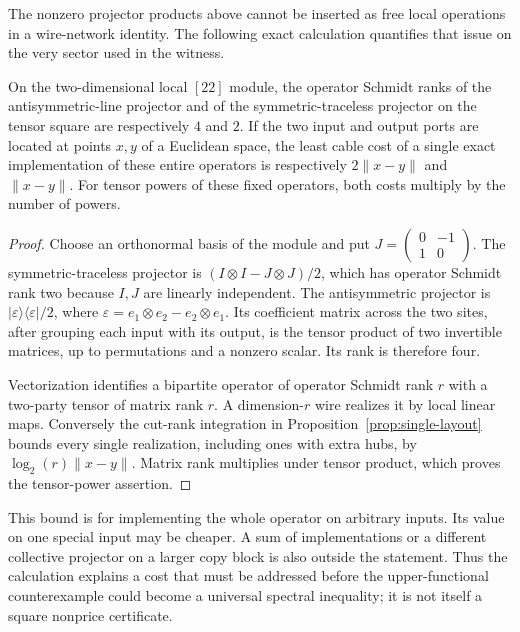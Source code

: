 The nonzero projector products above cannot be inserted as free local
operations in a wire-network identity. The following exact calculation
quantifies that issue on the very sector used in the witness.

\begin{proposition}\label{prop:crossing-projector-cost}
On the two-dimensional local $[22]$ module, the operator Schmidt ranks
of the antisymmetric-line projector and of the symmetric-traceless
projector on the tensor square are respectively $4$ and $2$.
If the two input and output ports are located at points $x,y$ of a
Euclidean space, the least cable cost of a single exact implementation
of these entire operators is respectively $2\|x-y\|$ and $\|x-y\|$.
For tensor powers of these fixed operators, both costs multiply by the
number of powers.
\end{proposition}

\begin{proof}
Choose an orthonormal basis of the module and put
$J=\left(\begin{smallmatrix}0&-1\\1&0\end{smallmatrix}\right)$.
The symmetric-traceless projector is
$(I\otimes I-J\otimes J)/2$, which has operator Schmidt rank two
because $I,J$ are linearly independent. The antisymmetric projector
is $|\varepsilon\rangle\langle\varepsilon|/2$, where
$\varepsilon=e_1\otimes e_2-e_2\otimes e_1$. Its coefficient matrix
across the two sites, after grouping each input with its output, is
the tensor product of two invertible matrices, up to permutations
and a nonzero scalar. Its rank is therefore four.

Vectorization identifies a bipartite operator of operator Schmidt
rank $r$ with a two-party tensor of matrix rank $r$. A dimension-$r$
wire realizes it by local linear maps. Conversely the cut-rank
integration in Proposition~\ref{prop:single-layout} bounds every
single realization, including ones with extra hubs, by
$\log_2(r)\|x-y\|$. Matrix rank multiplies under tensor product,
which proves the tensor-power assertion.
\end{proof}

This bound is for implementing the whole operator on arbitrary inputs.
Its value on one special input may be cheaper. A sum of implementations
or a different collective projector on a larger copy block is also
outside the statement. Thus the calculation explains a cost that must
be addressed before the upper-functional counterexample could become
a universal spectral inequality; it is not itself a square nonprice
certificate.
